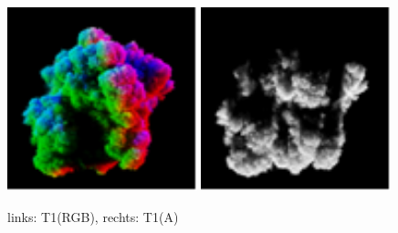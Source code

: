 \begin{figure}[h]
	\centering
	\includegraphics[width=0.49\textwidth]{Grafiken/Implementation/T1_RGB.png}
	\includegraphics[width=0.49\textwidth]{Grafiken/Implementation/T1_A.png}
	\begin{footnotesize}
		\caption{links: T1(RGB), rechts: T1(A)}
	\end{footnotesize}
	\label{fig:combinedChannel}
\end{figure}

